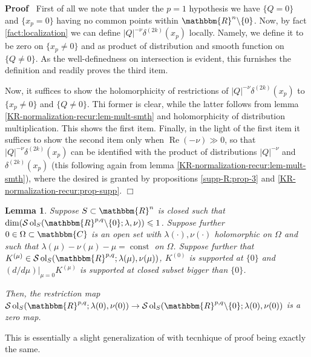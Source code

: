 \documentclass{article}
\newcommand{\tmop}[1]{\ensuremath{\operatorname{#1}}}
\newenvironment{proof}{\noindent\textbf{Proof\ }}{\hspace*{\fill}$\Box$\medskip}
\numberwithin{definition}{section}
\newtheorem{lemma}{Lemma}
\numberwithin{lemma}{section}
\numberwithin{proposition}{section}
{\theorembodyfont{\rmfamily}\newtheorem{remark}{Remark}
\numberwithin{remark}{section}
}
\begin{document}
\begin{proof}
  First of all we note that under the $p = 1$ hypothesis we have $\{ Q = 0 \}$
  and $\{ x_p = 0 \}$ having no common points within $\mathbbm{R}^n \backslash
  \{ 0 \}$. Now, by fact \ref{fact:localization} we can define $| Q |^{- \nu}
  \delta^{( 2 k)} ( x_p)$ locally. Namely, we define it to be zero on $\{ x_p
  \neq 0 \}$ and as product of distribution and smooth function on $\{ Q \neq
  0 \}$. As the well-definedness on intersection is evident, this furnishes
  the definition and readily proves the third item.
  
  Now, it suffices to show the holomorphicity of restrictions of $| Q |^{-
  \nu} \delta^{( 2 k)} ( x_p)$ to $\{ x_p \neq 0 \}$ and $\{ Q \neq 0 \}$. Thi
  former is clear, while the latter follows from lemma
  \ref{KR-normalization-recur:lem-mult-smth} and holomorphicity of
  distribution multiplication. This shows the first item. Finally, in the
  light of the first item it suffices to show the second item only when
  $\tmop{Re} ( - \nu) \gg 0$, so that $| Q |^{- \nu} \delta^{( 2 k)} ( x_p)$
  can be identified with the product of distributions $| Q |^{- \nu}$ and
  $\delta^{( 2 k)} ( x_p)$ (this following again from lemma
  \ref{KR-normalization-recur:lem-mult-smth}), where the desired is granted by
  propositions \ref{supp-R:prop-3} and \ref{KR-normalization-recur:prop-supp}.
\end{proof}

\begin{lemma}
  \label{sol-MO:lem-zeromap-point}Suppose $S \subset \mathbbm{R}^n$ is closed
  such that $\dim ( \mathcal{S} \tmop{ol}_S ( \mathbbm{R}^{p, q} \backslash \{
  0 \} ; \lambda, \nu)) \leqslant 1$. Suppose further $0 \in \Omega \subset
  \mathbbm{C}$ is an open set with $\lambda ( \cdot), \nu ( \cdot)$
  holomorphic on $\Omega$ and such that $\lambda ( \mu) - \nu ( \mu) - \mu =
  \tmop{const}$ on $\Omega$. Suppose further that $K_{}^{( \mu)} \in
  \mathcal{S} \tmop{ol}_S ( \mathbbm{R}^{p, q} ; \lambda ( \mu), \nu ( \mu))$,
  $K_{}^{( 0)}$ is supported at $\{ 0 \}$ and $( d / d \mu) |_{\mu = 0}
  K_{}^{( \mu)}$ is supported at closed subset bigger than $\{ 0 \}$.
  
  Then, the restriction map $\mathcal{S} \tmop{ol}_S ( \mathbbm{R}^{p, q} ;
  \lambda ( 0), \nu ( 0)) \rightarrow \mathcal{S} \tmop{ol}_S (
  \mathbbm{R}^{p, q} \backslash \{ 0 \} ; \lambda ( 0), \nu ( 0))$ is a zero
  map.
\end{lemma}

\begin{remark}
  This is essentially a slight generalization of {\cite[lemma
  11.8]{kobayashi2015symmetry}} with tecnhique of proof being exactly the
  same.
\end{remark}
\end{document}

